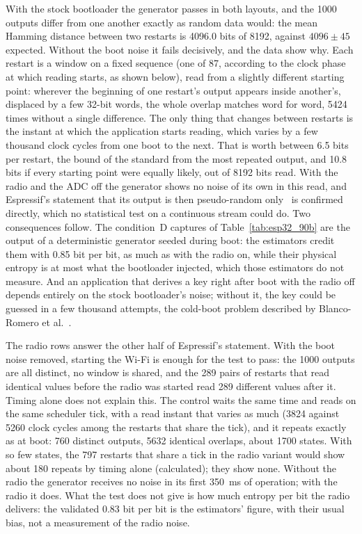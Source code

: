 With the stock bootloader the generator passes in both layouts, and the
1000 outputs differ from one another exactly as random data would: the
mean Hamming distance between two restarts is 4096.0 bits of 8192,
against $4096 \pm 45$ expected. Without the boot noise it fails
decisively, and the data show why. Each restart is a window on a fixed
sequence (one of 87, according to the clock phase at which reading
starts, as shown below), read from a slightly different starting point: wherever the
beginning of one restart's output appears inside another's, displaced by
a few 32-bit words, the whole overlap matches word for word, 5424 times
without a single difference. The only thing that changes between restarts
is the instant at which the application starts reading, which varies by a
few thousand clock cycles from one boot to the next. That is worth between
6.5 bits per restart, the bound of the standard from the most repeated
output, and 10.8 bits if every starting point were equally likely, out of
8192 bits read. With the radio and the ADC off the generator shows no noise
of its own in this read, and Espressif's statement that its output is then
pseudo-random only~\cite{espressif_idf_random} is confirmed directly,
which no statistical test on a continuous stream could do. Two
consequences follow. The condition~D captures of
Table~\ref{tab:esp32_90b} are the output of a deterministic generator
seeded during boot: the estimators credit them with 0.85 bit per bit, as
much as with the radio on, while their physical entropy is at most what
the bootloader injected, which those estimators do not measure. And an
application that derives a key right after boot with the radio off
depends entirely on the stock bootloader's noise; without it, the key
could be guessed in a few thousand attempts, the cold-boot problem
described by Blanco-Romero et al.~\cite{blancoromero_2026_entropy}.

The radio rows answer the other half of Espressif's statement. With the
boot noise removed, starting the Wi-Fi is enough for the test to pass:
the 1000 outputs are all distinct, no window is shared, and the 289 pairs
of restarts that read identical values before the radio was started read
289 different values after it. Timing alone does not explain this. The
control waits the same time and reads on the same scheduler tick, with a
read instant that varies as much (3824 against 5260 clock cycles among
the restarts that share the tick), and it repeats exactly as at boot:
760 distinct outputs, 5632 identical overlaps, about 1700 states. With so
few states, the 797 restarts that share a tick in the radio variant would
show about 180 repeats by timing alone (calculated); they show none. Without the
radio the generator receives no noise in its first 350~ms of operation;
with the radio it does. What the test does not give is how much entropy
per bit the radio delivers: the validated 0.83 bit per bit is the
estimators' figure, with their usual bias, not a measurement of the
radio noise.

